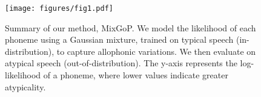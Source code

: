 \begin{figure}[t]
    \centering
    \texttt{[image: figures/fig1.pdf]}
    \caption{
    Summary of our method, MixGoP.
    We model the likelihood of each phoneme using a Gaussian mixture, trained on typical speech (in-distribution), to capture allophonic variations. 
    We then evaluate on atypical speech (out-of-distribution). 
    The y-axis represents the log-likelihood of a phoneme, where lower values indicate greater atypicality.
    }
    \label{fig:summary}
\end{figure}